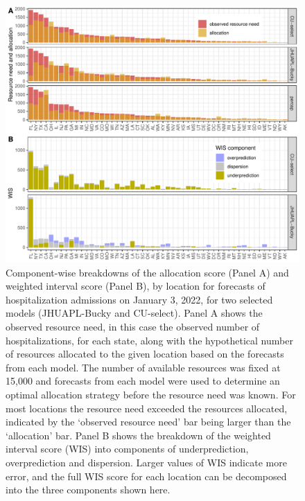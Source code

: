 \documentclass{article}\usepackage[]{graphicx}\usepackage[]{xcolor}
\makeatletter
\def\maxwidth{ %
  \ifdim\Gin@nat@width>\linewidth
    \linewidth
  \else
    \Gin@nat@width
  \fi
}
\newenvironment{knitrout}{}{} %
\makeatother
\begin{document}
\begin{knitrout}
\color{fgcolor}\begin{figure}
\includegraphics[width=\maxwidth]{figure/multi-loc-ranks-1} \caption[Component-wise breakdowns of the allocation score (Panel A) and weighted interval score (Panel B), by location for forecasts of hospitalization admissions on January 3, 2022, for two selected models (JHUAPL-Bucky and CU-select)]{Component-wise breakdowns of the allocation score (Panel A) and weighted interval score (Panel B), by location for forecasts of hospitalization admissions on January 3, 2022, for two selected models (JHUAPL-Bucky and CU-select). Panel A shows the observed resource need, in this case the observed number of hospitalizations, for each state, along with the hypothetical number of resources allocated to the given location based on the forecasts from each model. The number of available resources was fixed at 15,000 and forecasts from each model were used to determine an optimal allocation strategy before the resource need was known. For most locations the resource need exceeded the resources allocated, indicated by the `observed resource need' bar being larger than the `allocation' bar. Panel B shows the breakdown of the weighted interval score (WIS) into components of underprediction, overprediction and dispersion. Larger values of WIS indicate more error, and the full WIS score for each location can be decomposed into the three components shown here.}\label{fig:multi-loc-ranks}
\end{figure}

\end{knitrout}
\end{document}
